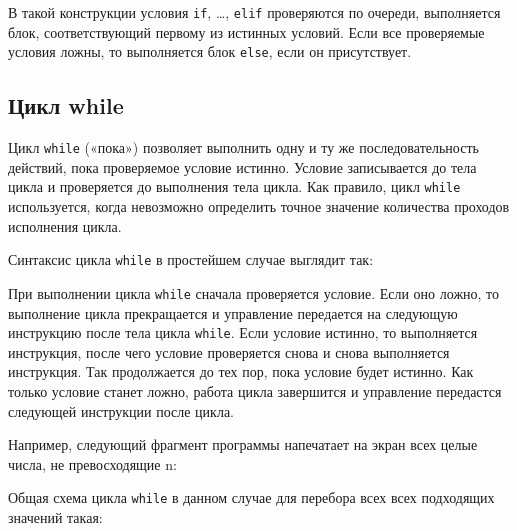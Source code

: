 В такой конструкции условия \texttt{if}, \ldots{}, \texttt{elif}
проверяются по очереди, выполняется блок, соответствующий первому из
истинных условий. Если все проверяемые условия ложны, то выполняется
блок \texttt{else}, если он присутствует.

\subsection{Цикл while}\label{ux446ux438ux43aux43b-while}

Цикл \texttt{while} («пока») позволяет выполнить одну и ту же
последовательность действий, пока проверяемое условие истинно. Условие
записывается до тела цикла и проверяется до выполнения тела цикла. Как
правило, цикл \texttt{while} используется, когда невозможно определить
точное значение количества проходов исполнения цикла.

Синтаксис цикла \texttt{while} в простейшем случае выглядит так:

\begin{Shaded}
\begin{Highlighting}[]
 
\end{Highlighting}
\end{Shaded}

При выполнении цикла \texttt{while} сначала проверяется условие. Если
оно ложно, то выполнение цикла прекращается и управление передается на
следующую инструкцию после тела цикла \texttt{while}. Если условие
истинно, то выполняется инструкция, после чего условие проверяется снова
и снова выполняется инструкция. Так продолжается до тех пор, пока
условие будет истинно. Как только условие станет ложно, работа цикла
завершится и управление передастся следующей инструкции после цикла.

Например, следующий фрагмент программы напечатает на экран всех целые
числа, не превосходящие n:

\begin{Shaded}
\begin{Highlighting}[]
\OperatorTok{=} 
 \OperatorTok{<=} 
    \OperatorTok{+=} 
\end{Highlighting}
\end{Shaded}

Общая схема цикла \texttt{while} в данном случае для перебора всех всех
подходящих значений такая:

